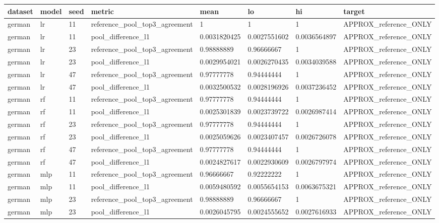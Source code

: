 \begin{tabular}{llllllll}
\toprule
dataset & model & seed & metric & mean & lo & hi & target \\
\midrule
german & lr & 11 & reference\_pool\_top3\_agreement & 1 & 1 & 1 & APPROX\_reference\_ONLY \\
german & lr & 11 & pool\_difference\_l1 & 0.0031820425 & 0.0027551602 & 0.0036564897 & APPROX\_reference\_ONLY \\
german & lr & 23 & reference\_pool\_top3\_agreement & 0.98888889 & 0.96666667 & 1 & APPROX\_reference\_ONLY \\
german & lr & 23 & pool\_difference\_l1 & 0.0029954021 & 0.0026270435 & 0.0034039588 & APPROX\_reference\_ONLY \\
german & lr & 47 & reference\_pool\_top3\_agreement & 0.97777778 & 0.94444444 & 1 & APPROX\_reference\_ONLY \\
german & lr & 47 & pool\_difference\_l1 & 0.0032500532 & 0.0028196926 & 0.0037236452 & APPROX\_reference\_ONLY \\
german & rf & 11 & reference\_pool\_top3\_agreement & 0.97777778 & 0.94444444 & 1 & APPROX\_reference\_ONLY \\
german & rf & 11 & pool\_difference\_l1 & 0.0025301839 & 0.0023739722 & 0.0026987414 & APPROX\_reference\_ONLY \\
german & rf & 23 & reference\_pool\_top3\_agreement & 0.97777778 & 0.94444444 & 1 & APPROX\_reference\_ONLY \\
german & rf & 23 & pool\_difference\_l1 & 0.0025059626 & 0.0023407457 & 0.0026726078 & APPROX\_reference\_ONLY \\
german & rf & 47 & reference\_pool\_top3\_agreement & 0.97777778 & 0.94444444 & 1 & APPROX\_reference\_ONLY \\
german & rf & 47 & pool\_difference\_l1 & 0.0024827617 & 0.0022930609 & 0.0026797974 & APPROX\_reference\_ONLY \\
german & mlp & 11 & reference\_pool\_top3\_agreement & 0.96666667 & 0.92222222 & 1 & APPROX\_reference\_ONLY \\
german & mlp & 11 & pool\_difference\_l1 & 0.0059480592 & 0.0055654153 & 0.0063675321 & APPROX\_reference\_ONLY \\
german & mlp & 23 & reference\_pool\_top3\_agreement & 0.98888889 & 0.96666667 & 1 & APPROX\_reference\_ONLY \\
german & mlp & 23 & pool\_difference\_l1 & 0.0026045795 & 0.0024555652 & 0.0027616933 & APPROX\_reference\_ONLY \\

\end{tabular}
